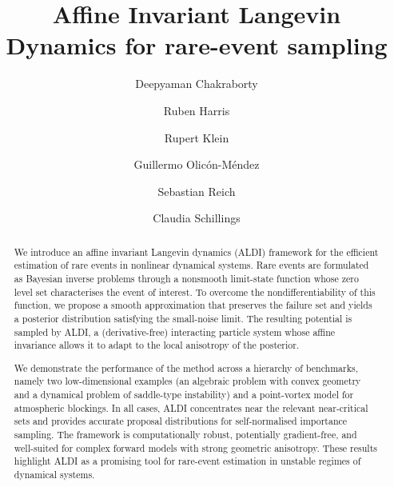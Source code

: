 \documentclass[a4paper]{article}
\numberwithin{equation}{section}
\begin{document}
\title{Affine Invariant Langevin Dynamics for rare-event sampling}

\author[1]{Deepyaman Chakraborty}

\author[1]{Ruben Harris}

\author[1]{Rupert Klein}

\author[2]{Guillermo Olic\'on-M\'endez}

\author[2]{Sebastian Reich}


\author[1]{Claudia Schillings}





\maketitle


\begin{abstract}
We introduce an affine invariant Langevin dynamics (ALDI) framework for the
efficient estimation of rare events in nonlinear dynamical systems. Rare events are formulated as Bayesian inverse
problems through a nonsmooth limit-state function whose zero level set characterises the
event of interest. To overcome the nondifferentiability of this function, we
propose a smooth approximation that preserves the failure set and yields a
posterior distribution satisfying the small-noise limit. The resulting potential
is sampled by ALDI, a (derivative-free) interacting particle system whose affine
invariance allows it to adapt to the local anisotropy of the posterior.

We demonstrate the performance of the method across a hierarchy of benchmarks, namely
two low-dimensional examples (an algebraic problem with convex geometry and a dynamical problem of saddle-type instability) and a point-vortex model for atmospheric blockings. In all cases, ALDI
concentrates near the relevant near-critical sets and provides accurate
proposal distributions for self-normalised importance sampling. The framework is
computationally robust, potentially gradient-free, and well-suited for complex forward
models with strong geometric anisotropy. These results highlight ALDI as a
promising tool for rare-event estimation in unstable regimes of dynamical systems.
\end{abstract}
\end{document}

